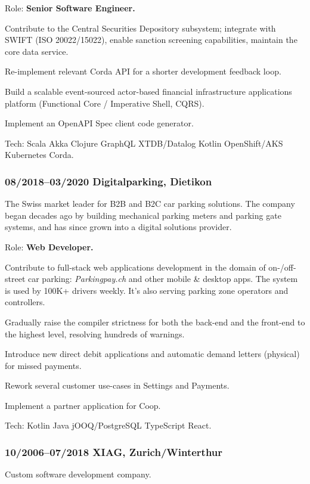 \documentclass[a4paper, twocolumn, 10pt]{article}
\begin{document}
Role: \textbf{Senior Software Engineer.}

Contribute to the Central Securities Depository subsystem; integrate with SWIFT (ISO 20022/15022),
enable sanction screening capabilities, maintain the core data service.

Re-implement relevant Corda API for a shorter development feedback loop.

Build a scalable event-sourced actor-based financial infrastructure applications platform (Functional Core /
Imperative Shell, CQRS).

Implement an OpenAPI Spec client code generator.

Tech: Scala Akka Clojure GraphQL XTDB/Datalog Kotlin OpenShift/AKS Kubernetes Corda.

\subsubsection*{08/2018--03/2020 Digitalparking, Dietikon}

The Swiss market leader for B2B and B2C car parking solutions. The company began decades ago by
building mechanical parking meters and parking gate systems, and has since grown into a digital
solutions provider.

Role: \textbf{Web Developer.}

Contribute to full-stack web applications development in the domain of on-/off-street car parking:
\emph{Parkingpay.ch} and other mobile \& desktop apps. The system is used by 100K+ drivers
weekly. It's also serving parking zone operators and controllers.

Gradually raise the compiler strictness for both the back-end and the front-end to the highest
level, resolving hundreds of warnings.

Introduce new direct debit applications and automatic demand letters (physical) for missed payments.

Rework several customer use-cases in Settings and Payments.

Implement a partner application for Coop.

Tech: Kotlin Java jOOQ/PostgreSQL TypeScript React.

\subsubsection*{10/2006--07/2018 XIAG, Zurich/Winterthur}

Custom software development company.
\end{document}
